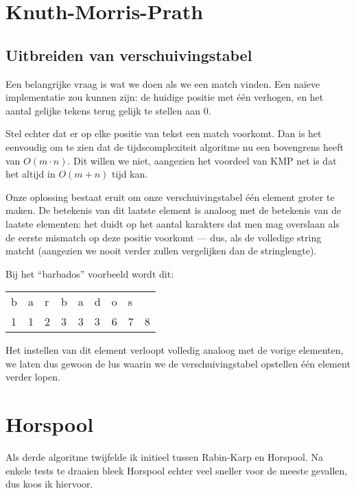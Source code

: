 \documentclass[a4paper,11pt]{article}
\begin{document}
\section{Knuth-Morris-Prath}

\subsection{Uitbreiden van verschuivingstabel}

Een belangrijke vraag is wat we doen als we een match vinden. Een na\"ieve
implementatie zou kunnen zijn: de huidige positie met \'e\'en verhogen, en het
aantal gelijke tekens terug gelijk te stellen aan 0.

Stel echter dat er op elke positie van tekst een match voorkomt. Dan is het
eenvoudig om te zien dat de tijdscomplexiteit algoritme nu een bovengrens heeft
van $O(m \cdot n)$. Dit willen we niet, aangezien het voordeel van KMP net is
dat het altijd in $O(m + n)$ tijd kan.

Onze oplossing bestaat eruit om onze verschuivingstabel \'e\'en element groter
te maken. De betekenis van dit laatste element is analoog met de betekenis van
de laatste elementen: het duidt op het aantal karakters dat men mag overslaan
als de eerste mismatch op deze positie voorkomt — dus, als de volledige string
matcht (aangezien we nooit verder zullen vergelijken dan de stringlengte).

Bij het “barbados” voorbeeld wordt dit:

\begin{center}
\begin{tabular}{lllllllll}
b & a & r & b & a & d & o & s &   \\
1 & 1 & 2 & 3 & 3 & 3 & 6 & 7 & 8 \\
\end{tabular}
\end{center}

Het instellen van dit element verloopt volledig analoog met de vorige elementen,
we laten dus gewoon de lus waarin we de verschuivingstabel opstellen \'e\'en
element verder lopen.

\section{Horspool}

Als derde algoritme twijfelde ik initieel tussen Rabin-Karp en Horspool. Na
enkele tests te draaien bleek Horspool echter veel sneller voor de meeste
gevallen, dus koos ik hiervoor.
\end{document}
